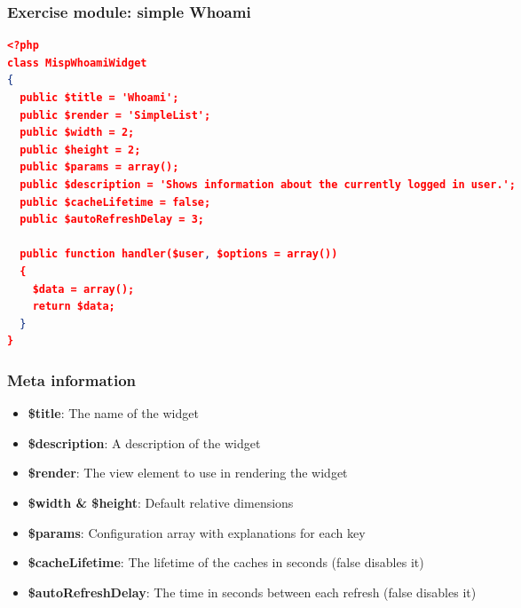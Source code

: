 \begin{frame}[fragile]
    \frametitle{Exercise module: simple Whoami}
    \begin{adjustbox}{width=\textwidth,height=8cm,keepaspectratio}
        \begin{lstlisting}[language=json,firstnumber=1]
<?php
class MispWhoamiWidget
{
  public $title = 'Whoami';
  public $render = 'SimpleList';
  public $width = 2;
  public $height = 2;
  public $params = array();
  public $description = 'Shows information about the currently logged in user.';
  public $cacheLifetime = false;
  public $autoRefreshDelay = 3;

  public function handler($user, $options = array())
  {
    $data = array();
    return $data;
  }
}
        \end{lstlisting}
    \end{adjustbox}
\end{frame}

\begin{frame}
  \frametitle{Meta information}
  \begin{itemize}
    \item {\bf \$title}: The name of the widget
    \item {\bf \$description}: A description of the widget
    \item {\bf \$render}: The view element to use in rendering the widget
    \item {\bf \$width \& \$height}: Default relative dimensions
    \item {\bf \$params}: Configuration array with explanations for each key
    \item {\bf \$cacheLifetime}: The lifetime of the caches in seconds (false disables it)
    \item {\bf \$autoRefreshDelay}: The time in seconds between each refresh (false disables it)
  \end{itemize}
  
\end{frame}

